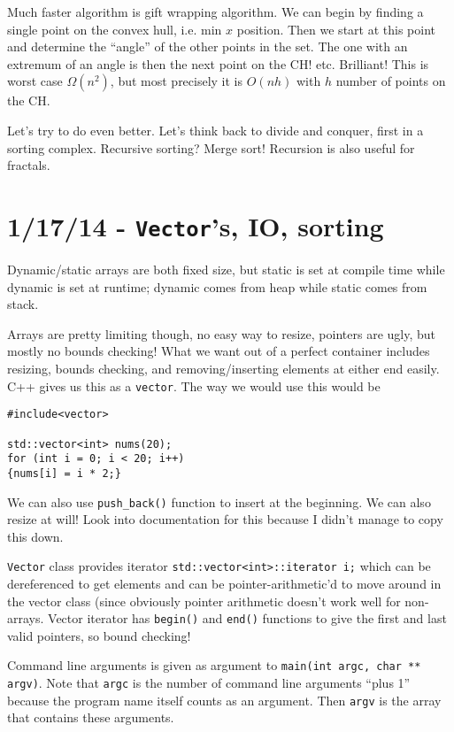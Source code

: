 \documentclass[10pt, twocolumn]{article}
\begin{document}
Much faster algorithm is gift wrapping algorithm. We can begin by finding a single point on the convex hull, i.e. min $x$ position. Then we start at this point and determine the ``angle'' of the other points in the set. The one with an extremum of an angle is then the next point on the CH! etc. Brilliant! This is worst case $\Omega(n^2)$, but most precisely it is $O(nh)$ with $h$ number of points on the CH.

Let's try to do even better. Let's think back to divide and conquer, first in a sorting complex. Recursive sorting? Merge sort! Recursion is also useful for fractals.
\section{1/17/14 - \texttt{Vector}'s, IO, sorting}

Dynamic/static arrays are both fixed size, but static is set at compile time while dynamic is set at runtime; dynamic comes from heap while static comes from stack.

Arrays are pretty limiting though, no easy way to resize, pointers are ugly, but mostly no bounds checking! What we want out of a perfect container includes resizing, bounds checking, and removing/inserting elements at either end easily. C++ gives us this as a \texttt{vector}. The way we would use this would be
\begin{verbatim}
#include<vector>

std::vector<int> nums(20);
for (int i = 0; i < 20; i++)
{nums[i] = i * 2;}
\end{verbatim}

We can also use \texttt{push\_back()} function to insert at the beginning. We can also resize at will! Look into documentation for this because I didn't manage to copy this down.

\texttt{Vector} class provides iterator \texttt{std::vector<int>::iterator i;} which can be dereferenced to get elements and can be pointer-arithmetic'd to move around in the vector class (since obviously pointer arithmetic doesn't work well for non-arrays. Vector iterator has \texttt{begin()} and \texttt{end()} functions to give the first and last valid pointers, so bound checking! 

Command line arguments is given as argument to \texttt{main(int argc, char ** argv)}. Note that \texttt{argc} is the number of command line arguments ``plus 1'' because the program name itself counts as an argument. Then \texttt{argv} is the array that contains these arguments. 
\end{document}
